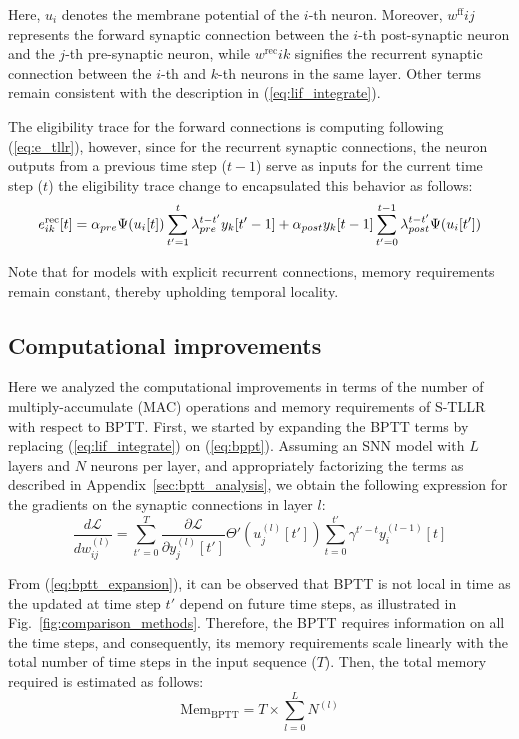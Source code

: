 \documentclass[10pt]{article} %
\begin{document}
    Here, $u_i$ denotes the membrane potential of the $i$-th neuron. 
    Moreover, $w^{\text{ff}}{ij}$ represents the forward synaptic connection between the $i$-th post-synaptic neuron and the $j$-th pre-synaptic neuron, while $w^{\text{rec}}{ik}$ signifies the recurrent synaptic connection between the $i$-th and $k$-th neurons in the same layer. 
    Other terms remain consistent with the description in (\ref{eq:lif_integrate}).

    The eligibility trace for the forward connections is computing following (\ref{eq:e_tllr}), however, since for the recurrent synaptic connections, the neuron outputs from a previous time step ($t-1$) serve as inputs for the current time step ($t$) the eligibility trace change to encapsulated this behavior as follows:
    \begin{equation}
        \label{eq:e_tllr_recurrent}
        e^{\text{rec}}_{ik}[t] = \alpha_{pre}\Psi(u_i[t])\sum_{t'=1}^{t}\lambda_{pre}^{t-t'}  y_k[t'-1] 
        \\+ \alpha_{post} y_k[t-1]\sum_{t'=0}^{t-1}\lambda_{post}^{t-t'} \Psi(u_i[t'])
    \end{equation}
    
    Note that for models with explicit recurrent connections, memory requirements remain constant, thereby upholding temporal locality.

    \subsection{Computational improvements}\label{sec:computational_improvements}
    Here we analyzed the computational improvements in terms of the number of multiply-accumulate (MAC) operations and memory requirements of S-TLLR with respect to BPTT.
    First, we started by expanding the BPTT terms by replacing (\ref{eq:lif_integrate}) on (\ref{eq:bppt}). 
    Assuming an SNN model with $L$ layers and $N$ neurons per layer, and  appropriately factorizing the terms as described in Appendix~\ref{sec:bptt_analysis}, we obtain the following expression for the gradients on the synaptic connections in layer $l$:
    \begin{equation}
    \frac{d \mathcal{L}}{d w_{ij}^{(l)}} = \sum_{t'=0}^T \frac{\partial \mathcal{L}}{\partial y_j^{(l)}[t']} \Theta'(u_j^{(l)}[t']) \sum^{t'}_{t=0}  \gamma^{t'-t} y_i^{(l-1)}[t]
    \label{eq:bptt_expansion}
    \end{equation}

    From (\ref{eq:bptt_expansion}), it can be observed that BPTT is not local in time as the updated at time step $t'$ depend on future time steps, as illustrated in Fig.~\ref{fig:comparison_methods}.
    Therefore, the BPTT requires information on all the time steps, and consequently, its memory requirements scale linearly with the total number of time steps in the input sequence ($T$). 
    Then, the total memory required is estimated as follows:
    \begin{equation}
        \text{Mem}_{\text{BPTT}} = T\times \sum_{l=0}^L N^{(l)}
    \end{equation}
\end{document}
